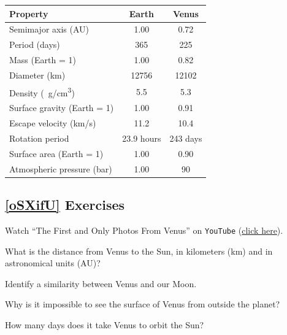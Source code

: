 \documentclass{article}
\numberwithin{equation}{section}
\numberwithin{figure}{section}
\begin{document}
\begin{center}
\begin{tabular}{|l|c|c|}
\hline
\textbf{Property} & \textbf{Earth} & \textbf{Venus}\\
\hline
Semimajor axis (AU)	& 1.00	& 0.72\\ \hline	
Period (days) & 365 & 225\\	\hline	
Mass (Earth = 1)	& 1.00 &	0.82\\	\hline	
Diameter (km)	& \num{12756} & \num{12102}	\\ \hline	
Density (\SI{}{g/cm^3})	& 5.5	& 5.3 \\\hline	
Surface gravity (Earth = 1)	& 1.00	& 0.91\\	\hline	
Escape velocity (km/s)	& 11.2	& 10.4\\	\hline	
Rotation period & 23.9 hours &	243 days\\	\hline	
Surface area (Earth = 1)	& 1.00 & 0.90\\	\hline	
Atmospheric pressure (bar)	& 1.00 & 90	\\ 
\hline
\end{tabular}
\end{center}

\clearpage

\subsection*{\ref{oSXifU} Exercises}

\begin{exercise}
    Watch ``The First and Only Photos From Venus'' on \texttt{YouTube} (\href{https://youtu.be/M5pXx_AjjlM}{click here}).
\end{exercise}

\begin{exercise}
    What is the distance from Venus to the Sun, in kilometers (km) and in astronomical units (AU)?
\end{exercise}

\begin{exercise}
    Identify a similarity between Venus and our Moon.
\end{exercise}

\begin{exercise}
    Why is it impossible to see the surface of Venus from outside the planet?
\end{exercise}

\begin{exercise}
    How many days does it take Venus to orbit the Sun?
\end{exercise}
\end{document}
